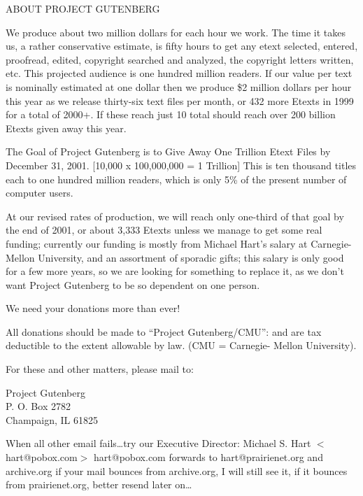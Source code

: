 \documentclass[12pt]{book}
\begin{document}
\newpage

\begin{center}
{\Large ABOUT PROJECT GUTENBERG}
\end{center}

We produce about two million dollars for each hour we work.  The
time it takes us, a rather conservative estimate, is fifty hours
to get any etext selected, entered, proofread, edited, copyright
searched and analyzed, the copyright letters written, etc.  This
projected audience is one hundred million readers.  If our value
per text is nominally estimated at one dollar then we produce \$2
million dollars per hour this year as we release thirty-six text
files per month, or 432 more Etexts in 1999 for a total of 2000+.
If these reach just 10%
total should reach over 200 billion Etexts given away this year.

The Goal of Project Gutenberg is to Give Away One Trillion Etext
Files by December 31, 2001.  [10,000 x 100,000,000 = 1 Trillion]
This is ten thousand titles each to one hundred million readers,
which is only 5\% of the present number of computer users.

At our revised rates of production, we will reach only one-third
of that goal by the end of 2001, or about 3,333 Etexts unless we
manage to get some real funding; currently our funding is mostly
from Michael Hart's salary at Carnegie-Mellon University, and an
assortment of sporadic gifts; this salary is only good for a few
more years, so we are looking for something to replace it, as we
don't want Project Gutenberg to be so dependent on one person.

We need your donations more than ever!


All donations should be made to ``Project Gutenberg/CMU'': and are
tax deductible to the extent allowable by law.  (CMU = Carnegie-
Mellon University).

For these and other matters, please mail to:

\begin{center}
Project Gutenberg \\
P. O. Box  2782 \\
Champaign, IL 61825
\end{center}

When all other email fails\ldots try our Executive Director:
Michael S. Hart $<$hart@pobox.com$>$
hart@pobox.com forwards to hart@prairienet.org and \newline archive.org
if your mail bounces from archive.org, I will still see it, if
it bounces from prairienet.org, better resend later on\ldots
\end{document}
